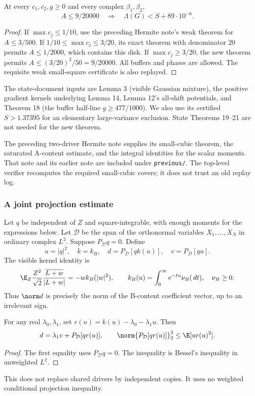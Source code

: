 \begin{theorem}
At every $c_1,c_2,g\ge0$ and every complex $\beta_1,\beta_2$,
\[
A\le9/20000\quad\Longrightarrow\quad\Lambda(G)<S+89\cdot10^{-6}.
\]
\end{theorem}
\begin{proof}
If $\max c_j\le1/10$, use the preceding Hermite note's weak theorem
for $A\le3/500$. If $1/10\le\max c_j\le3/20$, its exact theorem
with denominator $20$ permits $A\le1/2000$, which contains this disk.
If $\max c_j\ge3/20$, the new theorem permits
$A\le(3/20)^2/50=9/20000$. All buffers and phases are allowed.
The requisite weak small-square certificate is also replayed.
\end{proof}

The state-document inputs are Lemma 3 (visible Gaussian mixture), the
positive gradient kernels underlying Lemma 14, Lemma 12's all-shift
potentials, and Theorem 18 (the buffer half-line $g\ge477/1000$).
We also use its certified $S>1.37395$ for an elementary large-variance
exclusion. State Theorems 19--21 are not needed for the new theorem.

The preceding two-driver Hermite note supplies its small-cubic theorem,
the saturated A-content estimate, and the integral identities for the
scalar moments. That note and its earlier note are included under
\texttt{previous/}. The top-level verifier recomputes the required
small-cubic covers; it does not trust an old replay log.

\subsubsection{A joint projection estimate}
Let $q$ be independent of $Z$ and square-integrable, with enough moments
for the expressions below. Let $\mathcal D$ be the span of the
orthonormal variables $X_1,\ldots,X_N$ in ordinary complex $L^2$.
Suppose $P_{\mathcal D}q=0$. Define
\[
u=|q|^2,\quad k=k_B,\quad
d=P_{\mathcal D}[qk(u)],\quad v=P_{\mathcal D}[qu].
\]
The visible kernel identity is
\[
\E_Z\frac{Z^2}{\sqrt2}\frac{\overline{L+w}}{|L+w|}
=-wk_B(|w|^2),\qquad k_B(u)=\int_0^\infty e^{-tu}\nu_B(\,d t),\quad\nu_B\ge0.
\]
Thus $\norm d$ is precisely the norm of the B-content coefficient
vector, up to an irrelevant sign.

\begin{lemma}
For any real $\lambda_0,\lambda_1$, set
$r(u)=k(u)-\lambda_0-\lambda_1u$. Then
\[
d=\lambda_1v+P_{\mathcal D}[qr(u)],\qquad
\norm{P_{\mathcal D}[qr(u)]}_2^2\le\E[u r(u)^2].
\]
\end{lemma}
\begin{proof}
The first equality uses $P_{\mathcal D}q=0$. The inequality is Bessel's
inequality in unweighted $L^2$.
\end{proof}
This does not replace shared drivers by independent copies. It uses no
weighted conditional projection inequality.

